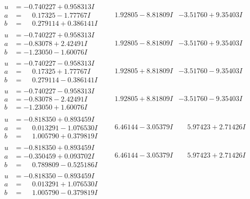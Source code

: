 \documentclass[1p]{elsarticle_modified}
\theoremstyle{definition}
\begin{document}
$$\begin{array}{c|c|c}
\begin{aligned}
u &= -0.740227 + 0.958313 I \\
a &= \phantom{-}0.17325 - 1.77767 I \\
b &= \phantom{-}0.279114 + 0.386141 I\end{aligned}
 & \phantom{-}1.92805 - 8.81809 I & -3.51760 + 9.35403 I \\ \hline\begin{aligned}
u &= -0.740227 + 0.958313 I \\
a &= -0.83078 + 2.42491 I \\
b &= -1.23050 - 1.60076 I\end{aligned}
 & \phantom{-}1.92805 - 8.81809 I & -3.51760 + 9.35403 I \\ \hline\begin{aligned}
u &= -0.740227 - 0.958313 I \\
a &= \phantom{-}0.17325 + 1.77767 I \\
b &= \phantom{-}0.279114 - 0.386141 I\end{aligned}
 & \phantom{-}1.92805 + 8.81809 I & -3.51760 - 9.35403 I \\ \hline\begin{aligned}
u &= -0.740227 - 0.958313 I \\
a &= -0.83078 - 2.42491 I \\
b &= -1.23050 + 1.60076 I\end{aligned}
 & \phantom{-}1.92805 + 8.81809 I & -3.51760 - 9.35403 I \\ \hline\begin{aligned}
u &= -0.818350 + 0.893459 I \\
a &= \phantom{-}0.013291 - 1.076530 I \\
b &= \phantom{-}1.005790 + 0.379819 I\end{aligned}
 & \phantom{-}6.46144 - 3.05379 I & \phantom{-}5.97423 + 2.71426 I \\ \hline\begin{aligned}
u &= -0.818350 + 0.893459 I \\
a &= -0.350459 + 0.093702 I \\
b &= \phantom{-}0.789809 - 0.525186 I\end{aligned}
 & \phantom{-}6.46144 - 3.05379 I & \phantom{-}5.97423 + 2.71426 I \\ \hline\begin{aligned}
u &= -0.818350 - 0.893459 I \\
a &= \phantom{-}0.013291 + 1.076530 I \\
b &= \phantom{-}1.005790 - 0.379819 I\end{aligned}

\end{array}$$
\end{document}
